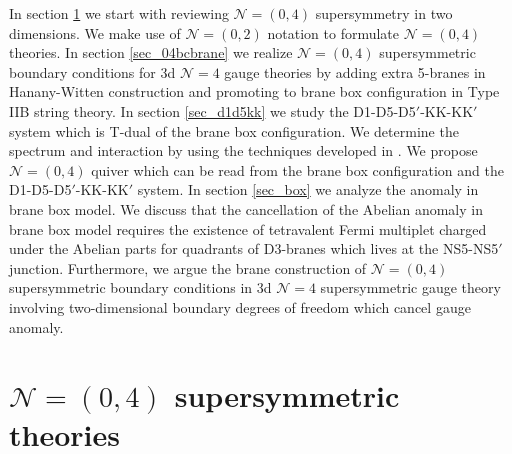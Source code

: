 \documentclass{article}
\numberwithin{equation}{section}
\begin{document}
In section \ref{sec_04theory} 
we start with reviewing $\mathcal{N}=(0,4)$ supersymmetry in two dimensions. 
We make use of $\mathcal{N}=(0,2)$ notation to formulate $\mathcal{N}=(0,4)$ theories. 
In section \ref{sec_04bcbrane} 
we realize $\mathcal{N}=(0,4)$ supersymmetric boundary conditions 
for 3d $\mathcal{N}=4$ gauge theories by adding extra 5-branes in Hanany-Witten construction 
and promoting to brane box configuration in Type IIB string theory. 
In section \ref{sec_d1d5kk} 
we study the D1-D5-D5$'$-KK-KK$'$ system 
which is T-dual of the brane box configuration. 
We determine the spectrum and interaction by using the techniques developed in \cite{Douglas:1996sw}. 
We propose $\mathcal{N}=(0,4)$ quiver which can be read from the brane box configuration 
and the D1-D5-D5$'$-KK-KK$'$ system. 
In section \ref{sec_box} 
we analyze the anomaly in brane box model. 
We discuss that 
the cancellation of the Abelian anomaly in brane box model 
requires the existence of tetravalent Fermi multiplet charged under the Abelian parts 
for quadrants of D3-branes which lives at the NS5-NS5$'$ junction. 
Furthermore, we argue the brane construction of 
$\mathcal{N}=(0,4)$ supersymmetric boundary conditions 
in 3d $\mathcal{N}=4$ supersymmetric gauge theory 
involving two-dimensional boundary degrees of freedom 
which cancel gauge anomaly. 




\section{$\mathcal{N}=(0,4)$ supersymmetric theories}
\label{sec_04theory}
\end{document}
